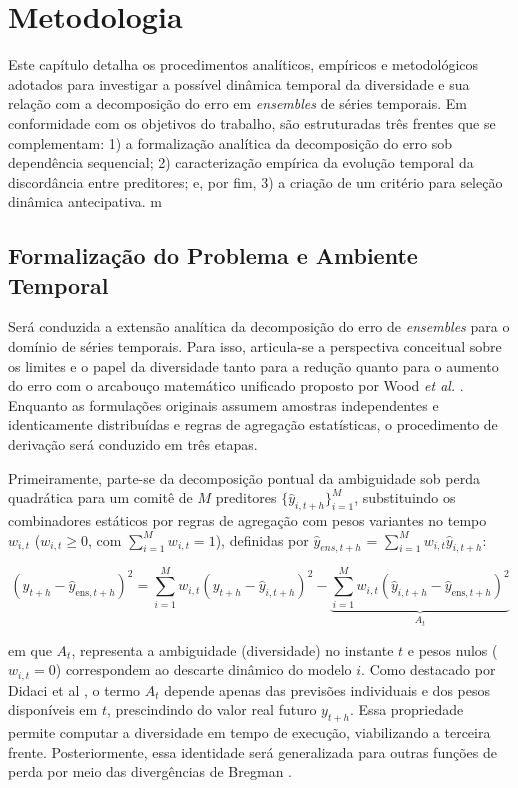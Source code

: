 \chapter{Metodologia}

Este capítulo detalha os procedimentos analíticos, empíricos e metodológicos adotados para investigar a possível dinâmica temporal da diversidade e sua relação com a decomposição do erro em \textit{ensembles} de séries temporais. Em conformidade com os objetivos do trabalho, são estruturadas três frentes que se complementam: 1) a formalização analítica da decomposição do erro sob dependência sequencial; 2) caracterização empírica da evolução temporal da discordância entre preditores; e, por fim, 3) a criação de um critério para seleção dinâmica antecipativa.
m
\section{Formalização do Problema e Ambiente Temporal}
Será conduzida a extensão analítica da decomposição do erro de \textit{ensembles} para o domínio de séries temporais. Para isso, articula-se a perspectiva conceitual sobre os limites e o papel da diversidade tanto para a redução quanto para o aumento do erro \cite{didaciDiversityClassifierEnsembles2013} com o arcabouço matemático unificado proposto por Wood \textit{et al.} \cite{woodUnifiedTheoryDiversity}. Enquanto as formulações originais assumem amostras independentes e identicamente distribuídas e regras de agregação estatísticas, o procedimento de derivação será conduzido em três etapas. 

Primeiramente, parte-se da decomposição pontual da ambiguidade sob perda quadrática para um comitê de $M$ preditores $\{\hat{y}_{i, t+h}\}_{i=1}^M$, substituindo os combinadores estáticos por regras de agregação com pesos variantes no tempo $w_{i, t}$ ($w_{i,t} \ge 0$, com $\sum_{i=1}^{M} w_{i,t} = 1$), definidas por $\hat{y}_{ens, t +h}$ = $\sum_{i=1}^{M} w_{i, t} \hat{y}_{i, t+h}$:

\begin{equation}
    (y_{t+h} - \hat{y}_{\text{ens}, t+h})^2 = \sum_{i=1}^{M} w_{i,t} (y_{t+h} - \hat{y}_{i, t+h})^2 - \underbrace{\sum_{i=1}^{M} w_{i,t} (\hat{y}_{i, t+h} - \hat{y}_{\text{ens}, t+h})^2}_{A_t}
\end{equation}

em que $A_t$, representa a ambiguidade (diversidade) no instante $t$ e pesos nulos ($w_{i, t} = 0$) correspondem ao descarte dinâmico do modelo $i$. Como destacado por Didaci et al \cite{didaciDiversityClassifierEnsembles2013}, o termo $A_t$ depende apenas das previsões individuais e dos pesos disponíveis em $t$, prescindindo do valor real futuro $y_{t+h}$. Essa propriedade permite computar a diversidade em tempo de execução, viabilizando a terceira frente. Posteriormente, essa identidade será generalizada para outras funções de perda por meio das divergências de Bregman \cite{woodUnifiedTheoryDiversity}.

